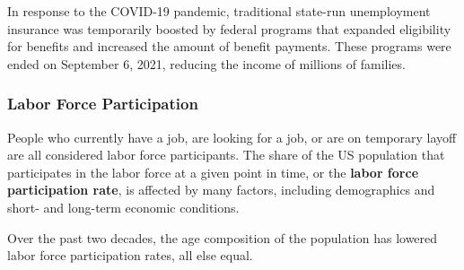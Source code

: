 \documentclass{report}
\begin{document}
{\begin{minipage}{0.76\textwidth}
\small In response to the COVID-19 pandemic, traditional state-run unemployment insurance was temporarily boosted by federal programs that expanded eligibility for benefits and increased the amount of benefit payments. These programs were ended on September 6, 2021, reducing the income of millions of families. 

%

\end{minipage}
\newpage
\hypertarget{labp}{}
\begin{minipage}{0.76\textwidth}
\subsubsection*{Labor Force Participation}
\small People who currently have a job, are looking for a job, or are on temporary layoff are all considered labor force participants. The share of the US population that participates in the labor force at a given point in time, or the \textbf{labor force participation rate}, is affected by many factors, including demographics and short- and long-term economic conditions.

Over the past two decades, the age composition of the population has lowered labor force participation rates, all else equal. 


\vspace{2mm}


\end{minipage}}
\end{document}
